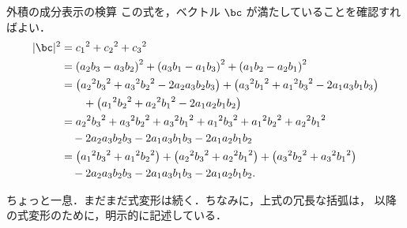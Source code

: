 \begin{mysmallsec}{外積の成分表示の検算}
                この式を，ベクトル $\bc$ が満たしていることを確認すればよい．
                    \begin{align*}
                        |\bc|^{2}
                        &=
                        {c_{1}}^{2}+{c_{2}}^{2}+{c_{3}}^{2} \\
                        &=
                         {(a_{2}b_{3} - a_{3}b_{2})}^{2}
                         + {(a_{3}b_{1} - a_{1}b_{3})}^{2}
                         + {(a_{1}b_{2} - a_{2}b_{1})}^{2} \\
                        &=
                        \left(
                            {a_{2}}^{2}{b_{3}}^{2} + {a_{3}}^{2}{b_{2}}^{2} - 2a_{2}a_{3}b_{2}b_{3}
                        \right)
                        + \left(
                            {a_{3}}^{2}{b_{1}}^{2} + {a_{1}}^{2}{b_{3}}^{2} - 2a_{1}a_{3}b_{1}b_{3}
                        \right) \\ &\qquad
                        + \left(
                            {a_{1}}^{2}{b_{2}}^{2} + {a_{2}}^{2}{b_{1}}^{2} - 2a_{1}a_{2}b_{1}b_{2}
                        \right) \\
                        &=
                          {a_{2}}^{2}{b_{3}}^{2} + {a_{3}}^{2}{b_{2}}^{2} + {a_{3}}^{2}{b_{1}}^{2}
                        + {a_{1}}^{2}{b_{3}}^{2} + {a_{1}}^{2}{b_{2}}^{2} + {a_{2}}^{2}{b_{1}}^{2} \\
                        &\quad - 2a_{2}a_{3}b_{2}b_{3} - 2a_{1}a_{3}b_{1}b_{3} - 2a_{1}a_{2}b_{1}b_{2} \\
                        &=
                          \left({a_{1}}^{2}{b_{3}}^{2} + {a_{1}}^{2}{b_{2}}^{2}\right)
                        + \left({a_{2}}^{2}{b_{3}}^{2} + {a_{2}}^{2}{b_{1}}^{2}\right)
                        + \left({a_{3}}^{2}{b_{2}}^{2} + {a_{3}}^{2}{b_{1}}^{2}\right) \\
                        &\quad - 2a_{2}a_{3}b_{2}b_{3} - 2a_{1}a_{3}b_{1}b_{3} - 2a_{1}a_{2}b_{1}b_{2}.
                    \end{align*}

                ちょっと一息．まだまだ式変形は続く．ちなみに，上式の冗長な括弧は，
                以降の式変形のために，明示的に記述している．


\end{mysmallsec}
